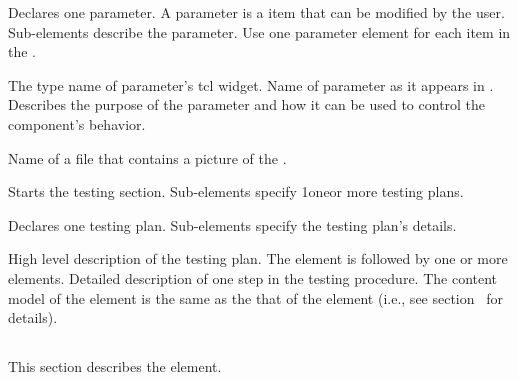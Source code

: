 \documentclass[11pt]{article}
\begin{document}
\begin{description}
\begin{description}
\begin{description}
       Declares one \gui{}  parameter.  A parameter is a
      \gui{}  item that can be modified by the user.  Sub-elements describe the
      parameter.  Use one parameter element for each item in the \gui.
      \begin{description}
         The type name of parameter's tcl widget.
        Name of parameter as it appears in \gui.
        Describes the purpose of the parameter and
        how it can be used to control the component's behavior.
      \end{description}
      Name of a file that contains a picture of the \gui.
    \end{description}
     Starts the testing section.  Sub-elements specify
    1oneor more testing plans.
    \begin{description}
       Declares one testing plan.  Sub-elements specify the
      testing plan's details.
      \begin{description}
          High level description of the testing
        plan.  The  element is followed by one or more
         elements.
         Detailed description of one step in the testing
        procedure.   The content model of the  element is the
        same as the that of the  element (i.e., see
        section~\sechyperref{\SUBSECdescElement} for details).
      \end{description}
    \end{description}
  \end{description}
\end{description}

\subsection{\SUBSECdescElement}
\label{\SUBSECdescElement}

This section describes the  element.

\paragraph{\SUBSUBSECdescElementIntro}
\label{\SUBSUBSECdescElementIntro}
\end{document}
